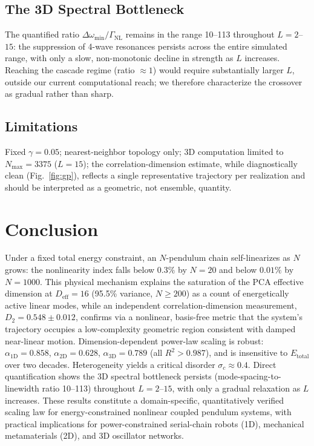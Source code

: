 \documentclass[aps,pre,12pt]{revtex4-2}
\begin{document}
\subsection{The 3D Spectral Bottleneck}
The quantified ratio $\Delta\omega_{\min}/\Gamma_{\text{NL}}$ remains in the range 10--113 throughout $L=2$--$15$: the suppression of 4-wave resonances persists across the entire simulated range, with only a slow, non-monotonic decline in strength as $L$ increases. Reaching the cascade regime (ratio $\approx1$) would require substantially larger $L$, outside our current computational reach; we therefore characterize the crossover as gradual rather than sharp.

\subsection{Limitations}
Fixed $\gamma=0.05$; nearest-neighbor topology only; 3D computation limited to $N_{\max}=3375$ ($L=15$); the correlation-dimension estimate, while diagnostically clean (Fig.~\ref{fig:gp}), reflects a single representative trajectory per realization and should be interpreted as a geometric, not ensemble, quantity.

\section{Conclusion}

Under a fixed total energy constraint, an $N$-pendulum chain self-linearizes as $N$ grows: the nonlinearity index falls below $0.3\%$ by $N=20$ and below $0.01\%$ by $N=1000$. This physical mechanism explains the saturation of the PCA effective dimension at $D_{\text{eff}}=16$ (95.5\% variance, $N\ge200$) as a count of energetically active linear modes, while an independent correlation-dimension measurement, $D_2=0.548\pm0.012$, confirms via a nonlinear, basis-free metric that the system's trajectory occupies a low-complexity geometric region consistent with damped near-linear motion. Dimension-dependent power-law scaling is robust: $\alpha_{1\text{D}}=0.858$, $\alpha_{2\text{D}}=0.628$, $\alpha_{3\text{D}}=0.789$ (all $R^2>0.987$), and is insensitive to $E_{\text{total}}$ over two decades. Heterogeneity yields a critical disorder $\sigma_c\approx0.4$. Direct quantification shows the 3D spectral bottleneck persists (mode-spacing-to-linewidth ratio 10--113) throughout $L=2$--$15$, with only a gradual relaxation as $L$ increases. These results constitute a domain-specific, quantitatively verified scaling law for energy-constrained nonlinear coupled pendulum systems, with practical implications for power-constrained serial-chain robots (1D), mechanical metamaterials (2D), and 3D oscillator networks.
\end{document}
